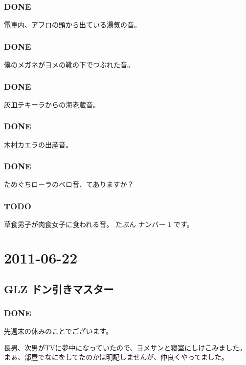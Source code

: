 \documentclass[11pt]{article}
\begin{document}
\subsubsection{\textbf{DONE}}
\label{sec-104_2_7}

電車内、アフロの頭から出ている湯気の音。
\subsubsection{\textbf{DONE}}
\label{sec-104_2_8}

僕のメガネがヨメの靴の下でつぶれた音。
\subsubsection{\textbf{DONE}}
\label{sec-104_2_9}

灰皿テキーラからの海老蔵音。
\subsubsection{\textbf{DONE}}
\label{sec-104_2_10}

木村カエラの出産音。
\subsubsection{\textbf{DONE}}
\label{sec-104_2_11}

ためぐちローラのベロ音、てありますか？
\subsubsection{\textbf{TODO}}
\label{sec-104_2_12}

草食男子が肉食女子に食われる音。
たぶん ナンバー 1 です。
\section{2011-06-22}
\label{sec-105}
\subsection{GLZ ドン引きマスター}
\label{sec-105_1}
\subsubsection{\textbf{DONE}}
\label{sec-105_1_1}

先週末の休みのことでございます。

長男、次男がTVに夢中になっていたので、ヨメサンと寝室にしけこみました。
まぁ、部屋でなにをしてたのかは明記しませんが、仲良くやってました。
\end{document}
